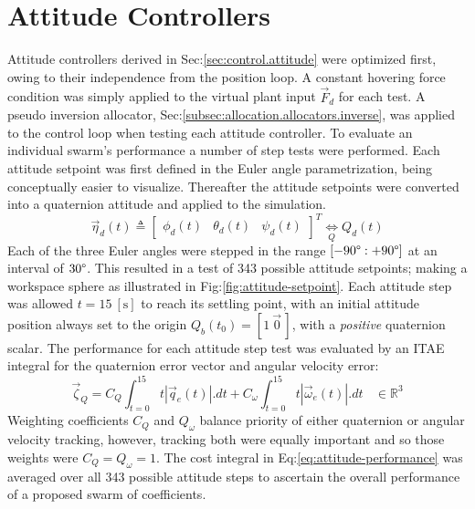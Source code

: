 \section{Attitude Controllers}
\label{sec:simulation.attitude}
Attitude controllers derived in Sec:\ref{sec:control.attitude} were optimized first, owing to their independence from the position loop. A constant hovering force condition was simply applied to the virtual plant input $\vec{F}_d$ for each test. A pseudo inversion allocator, Sec:\ref{subsec:allocation.allocators.inverse}, was applied to the control loop when testing each attitude controller. To evaluate an individual swarm's performance a number of step tests were performed. Each attitude setpoint was first defined in the Euler angle parametrization, being conceptually easier to visualize. Thereafter the attitude setpoints were converted into a quaternion attitude and applied to the simulation.
\begin{equation}
\vec{\eta}_d(t)\triangleq \begin{bmatrix}
\phi_d(t)&
\theta_d(t)&
\psi_d(t)
\end{bmatrix}^T\underset{Q}{\iff}Q_d(t)
\end{equation}
Each of the three Euler angles were stepped in the range $[-90\text{\textdegree}:+90\text{\textdegree}]$ at an interval of $30\text{\textdegree}$. This resulted in a test of 343 possible attitude setpoints; making a workspace sphere as illustrated in Fig:\ref{fig:attitude-setpoint}. Each attitude step was allowed $t=15~[\text{s}]$ to reach its settling point, with an initial attitude position always set to the origin $Q_b(t_0)=[1~\vec{0}\hspace{2pt}]$, with a \emph{positive} quaternion scalar. The performance for each attitude step test was evaluated by an ITAE integral for the quaternion error vector and angular velocity error:
\begin{equation}\label{eq:attitude-performance}
\vec{\zeta}_{Q}=C_Q\int_{t=0}^{15}t|\vec{q}_e(t)|.dt+C_\omega\int_{t=0}^{15}t|\vec{\omega}_e(t)|.dt~~~~\in\mathbb{R}^{3}
\end{equation}
Weighting coefficients $C_Q$ and $Q_\omega$ balance priority of either quaternion or angular velocity tracking, however, tracking both were equally important and so those weights were $C_Q=Q_\omega=1$. The cost integral in Eq:\ref{eq:attitude-performance} was averaged over all 343 possible attitude steps to ascertain the overall performance of a proposed swarm of coefficients.
